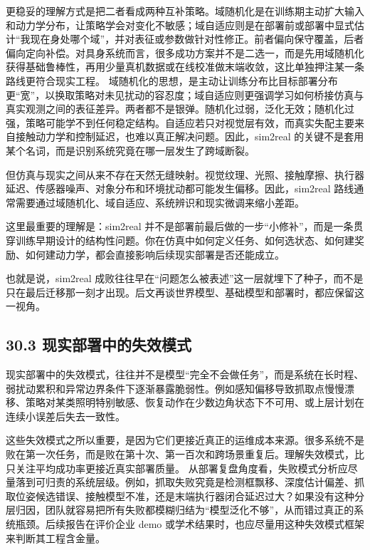 更稳妥的理解方式是把二者看成两种互补策略。域随机化是在训练期主动扩大输入和动力学分布，让策略学会对变化不敏感；域自适应则是在部署前或部署中显式估计“我现在身处哪个域”，并对表征或参数做针对性修正。前者偏向保守覆盖，后者偏向定向补偿。对具身系统而言，很多成功方案并不是二选一，而是先用域随机化获得基础鲁棒性，再用少量真机数据或在线校准做末端收敛，这比单独押注某一条路线更符合现实工程。 域随机化的思想，是主动让训练分布比目标部署分布更“宽”，以换取策略对未见扰动的容忍度；域自适应则更强调学习如何桥接仿真与真实观测之间的表征差异。两者都不是银弹。随机化过弱，泛化无效；随机化过强，策略可能学不到任何稳定结构。自适应若只对视觉层有效，而真实失配主要来自接触动力学和控制延迟，也难以真正解决问题。因此，sim2real 的关键不是套用某个名词，而是识别系统究竟在哪一层发生了跨域断裂。

但仿真与现实之间从来不存在天然无缝映射。视觉纹理、光照、接触摩擦、执行器延迟、传感器噪声、对象分布和环境扰动都可能发生偏移。因此，sim2real 路线通常需要通过域随机化、域自适应、系统辨识和现实微调来缩小差距。

这里最重要的理解是：sim2real 并不是部署前最后做的一步“小修补”，而是一条贯穿训练早期设计的结构性问题。你在仿真中如何定义任务、如何选状态、如何建奖励、如何建动力学，都会直接影响后续现实部署是否还能成立。

也就是说，sim2real 成败往往早在“问题怎么被表述”这一层就埋下了种子，而不是只在最后迁移那一刻才出现。后文再谈世界模型、基础模型和部署时，都应保留这一视角。

\subsection*{30.3 现实部署中的失效模式}


现实部署中的失效模式，往往并不是模型“完全不会做任务”，而是系统在长时程、弱扰动累积和异常边界条件下逐渐暴露脆弱性。例如感知偏移导致抓取点慢慢漂移、策略对某类照明特别敏感、恢复动作在少数边角状态下不可用、或上层计划在连续小误差后失去一致性。

这些失效模式之所以重要，是因为它们更接近真正的运维成本来源。很多系统不是败在第一次任务，而是败在第十次、第一百次和跨场景重复后。理解失效模式，比只关注平均成功率更接近真实部署质量。 从部署复盘角度看，失败模式分析应尽量落到可归责的系统层级。例如，抓取失败究竟是检测框飘移、深度估计偏差、抓取位姿候选错误、接触模型不准，还是末端执行器闭合延迟过大？如果没有这种分层归因，团队就容易把所有失败都模糊归结为“模型泛化不够”，从而错过真正的系统瓶颈。后续报告在评价企业 demo 或学术结果时，也应尽量用这种失效模式框架来判断其工程含金量。

